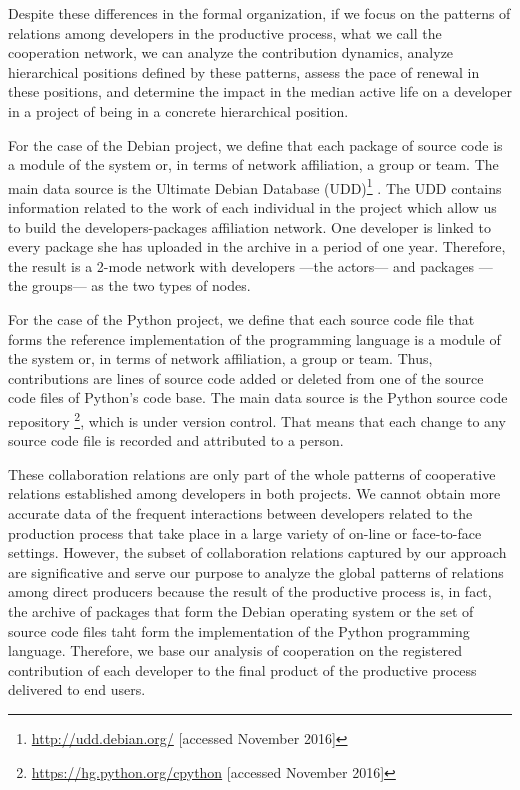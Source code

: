 Despite these differences in the formal organization, if we focus on the patterns of relations among developers in the productive process, what we call the cooperation network, we can analyze the contribution dynamics, analyze hierarchical positions defined by these patterns, assess the pace of renewal in these positions, and determine the impact in the median active life on a developer in a project of being in a concrete hierarchical position.

For the case of the Debian project, we define that each package of source code is a module of the system or, in terms of network affiliation, a group or team. The main data source is the Ultimate Debian Database (UDD)\footnote{\href{http://udd.debian.org/}{http://udd.debian.org/} [accessed November 2016]} \citep{udd:2010}. The UDD contains information related to the work of each individual in the project which allow us to build the developers-packages affiliation network. One developer is linked to every package she has uploaded in the archive in a period of one year. Therefore, the result is a 2-mode network with developers ---the actors--- and packages ---the groups--- as the two types of nodes.

For the case of the Python project, we define that each source code file that forms the reference implementation of the programming language is a module of the system or, in terms of network affiliation, a group or team. Thus, contributions are lines of source code added or deleted from one of the source code files of Python's code base. The main data source is the Python source code repository \footnote{\href{https://hg.python.org/cpython}{https://hg.python.org/cpython} [accessed November 2016]}, which is under version control. That means that each change to any source code file is recorded and attributed to a person.

These collaboration relations are only part of the whole patterns of cooperative relations established among developers in both projects. We cannot obtain more accurate data of the frequent interactions between developers related to the production process that take place in a large variety of on-line or face-to-face settings. However, the subset of collaboration relations captured by our approach are significative and serve our purpose to analyze the global patterns of relations among direct producers because the result of the productive process is, in fact, the archive of packages that form the Debian operating system or the set of source code files taht form the implementation of the Python programming language. Therefore, we base our analysis of cooperation on the registered contribution of each developer to the final product of the productive process delivered to end users.

